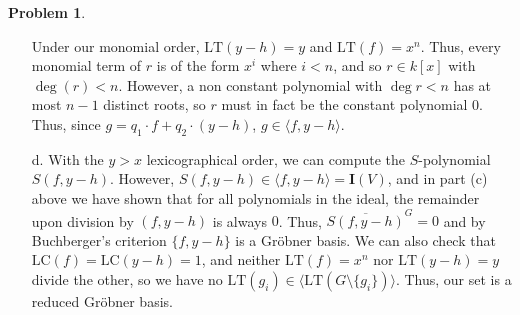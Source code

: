 \documentclass[12pt]{amsart}
\theoremstyle{definition}
\newtheorem{prob}{Problem}
\begin{document}
\begin{flushleft}
\begin{prob}
\begin{enumerate}
    Under our monomial order, $\text{LT}(y-h) = y$ and $\text{LT}(f)=x^n$. Thus, every monomial term of $r$ is of the form $x^i$ where $i<n$, and so $r \in k[x]$ with $\deg(r) < n$. However, a non constant polynomial with $\deg r < n$ has at most $n-1$ distinct roots, so $r$ must in fact be the constant polynomial $0$. Thus, since $g = q_1 \cdot f + q_2 \cdot (y-h)$, $g \in \langle f, y-h\rangle$.
    \item[d.] With the $y>x$ lexicographical order, we can compute the $S$-polynomial $S(f,y-h)$. However, $S(f,y-h) \in \langle f,y-h\rangle=\mathbf I(V)$, and in part (c) above we have shown that for all polynomials in the ideal, the remainder upon division by $(f,y-h)$ is always $0$. Thus, $\overline{S(f,y-h)}^G = 0$ and by Buchberger's criterion $\{f,y-h\}$ is a Gr\"obner basis. We can also check that $\text{LC}(f) = \text{LC}(y-h)=1$, and neither $\text{LT}(f)=x^n$ nor $\text{LT}(y-h)=y$ divide the other, so we have no $\text{LT}(g_i) \in \langle \text{LT}(G \setminus \{g_i\})\rangle$. Thus, our set is a reduced Gr\"obner basis.
\end{enumerate}

\end{prob}
\bigskip 




\end{flushleft}
\end{document}
